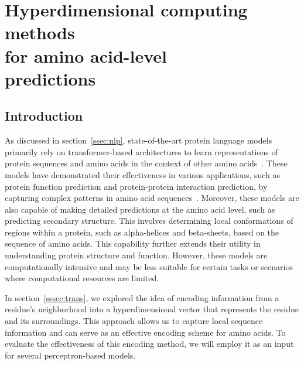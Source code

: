 \chapter[Hyperdimensional computing methods for amino acid-level predictions]{Hyperdimensional computing methods\\for amino acid-level\\predictions}
\section{Introduction}
As discussed in section~\ref{ssec:nlp}, state-of-the-art protein language models primarily rely on transformer-based architectures to learn representations of protein sequences and amino acids in the context of other amino acids~\cite{review}. These models have demonstrated their effectiveness in various applications, such as protein function prediction and protein-protein interaction prediction, by capturing complex patterns in amino acid sequences~\cite{esm2}. Moreover, these models are also capable of making detailed predictions at the amino acid level, such as predicting secondary structure. This involves determining local conformations of regions within a protein, such as alpha-helices and beta-sheets, based on the sequence of amino acids. This capability further extends their utility in understanding protein structure and function. However, these models are computationally intensive and may be less suitable for certain tasks or scenarios where computational resources are limited.

In section~\ref{sssec:trans}, we explored the idea of encoding information from a residue's neighborhood into a hyperdimensional vector that represents the residue and its surroundings. This approach allows us to capture local sequence information and can serve as an effective encoding scheme for amino acids. To evaluate the effectiveness of this encoding method, we will employ it as an input for several perceptron-based models.

